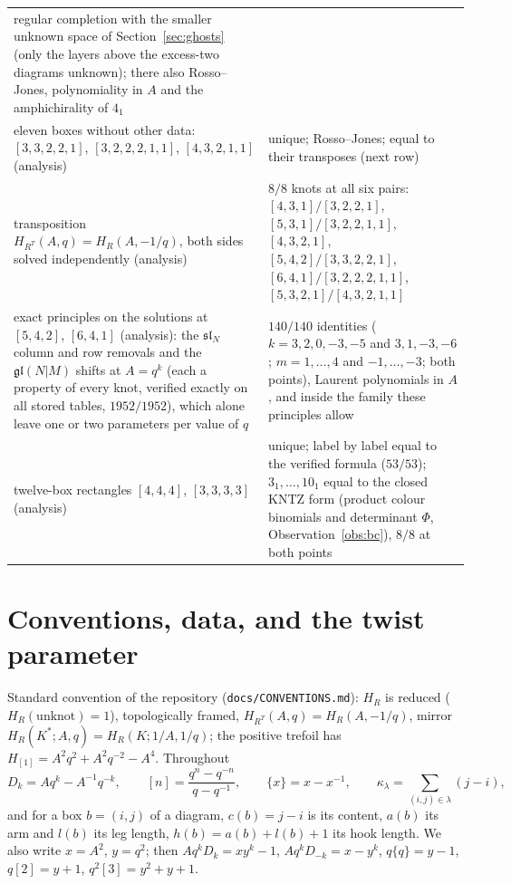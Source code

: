\documentclass[11pt]{article}
\newcommand{\LMPH}[1]{\texttt{#1}}
\begin{document}
{\begin{longtable}{>{\raggedright\arraybackslash}p{}>{\raggedright\arraybackslash}p{}}
regular completion with the smaller unknown space of Section~\ref{sec:ghosts} (only the layers above the
excess-two diagrams unknown); there also Rosso--Jones, polynomiality in $A$ and the amphichirality of $4_1$\\
eleven boxes without other data: $[3,3,2,2,1]$, $[3,2,2,2,1,1]$, $[4,3,2,1,1]$ (analysis) & unique; Rosso--Jones; equal to
their transposes (next row)\\
transposition $H_{R^T}(A,q)=H_R(A,-1/q)$, both sides solved independently (analysis) & $8/8$ knots at all six pairs:
$[4,3,1]/[3,2,2,1]$, $[5,3,1]/[3,2,2,1,1]$, $[4,3,2,1]$, $[5,4,2]/[3,3,2,2,1]$, $[6,4,1]/[3,2,2,2,1,1]$,
$[5,3,2,1]/[4,3,2,1,1]$\\
exact principles on the solutions at $[5,4,2]$, $[6,4,1]$ (analysis): the $\mathfrak{sl}_N$ column and row removals and
the $\mathfrak{gl}(N|M)$ shifts at $A=q^k$ (each a property of every knot, verified exactly on all stored tables,
$1952/1952$), which alone leave one or two parameters per value of $q$ & $140/140$ identities ($k=3,2,0,-3,-5$ and
$3,1,-3,-6$; $m=1,\dots,4$ and $-1,\dots,-3$; both points), Laurent polynomials in $A$, and inside the family these
principles allow\\
twelve-box rectangles $[4,4,4]$, $[3,3,3,3]$ (analysis) & unique; label by label equal to the verified formula ($53/53$);
$3_1,\dots,10_1$ equal to the closed KNTZ form (product colour binomials and determinant $\Phi$, Observation~\ref{obs:bc}),
$8/8$ at both points\\
\bottomrule
\end{longtable}}

\section{Conventions, data, and the twist parameter}\label{sec:conv}

Standard convention of the repository (\LMPH{docs/CONVENTIONS.md}): $H_R$ is reduced ($H_R(\text{unknot})=1$),
topologically framed, $H_{R^T}(A,q)=H_R(A,-1/q)$, mirror $H_R(K^*;A,q)=H_R(K;1/A,1/q)$; the positive trefoil has
$H_{[1]}=A^2q^2+A^2q^{-2}-A^4$.  Throughout
\[
D_k=Aq^k-A^{-1}q^{-k},\qquad [n]=\frac{q^n-q^{-n}}{q-q^{-1}},\qquad \{x\}=x-x^{-1},\qquad
\kappa_\lambda=\sum_{(i,j)\in\lambda}(j-i),
\]
and for a box $b=(i,j)$ of a diagram, $c(b)=j-i$ is its content, $a(b)$ its arm and $l(b)$ its leg length,
$h(b)=a(b)+l(b)+1$ its hook length.  We also write $x=A^2$, $y=q^2$; then $A q^k D_k = xy^k-1$, $Aq^kD_{-k}=x-y^k$,
$q\{q\}=y-1$, $q[2]=y+1$, $q^2[3]=y^2+y+1$.
\end{document}
